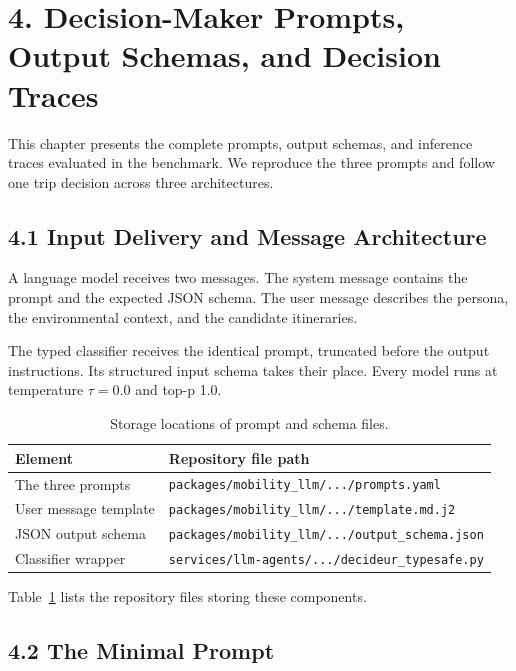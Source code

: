 \section{4. Decision-Maker Prompts, Output Schemas, and Decision Traces}

This chapter presents the complete prompts, output schemas, and inference traces evaluated in the benchmark. We reproduce the three prompts and follow one trip decision across three architectures.

\subsection{4.1 Input Delivery and Message Architecture}

A language model receives two messages. The system message contains the prompt and the expected JSON schema. The user message describes the persona, the environmental context, and the candidate itineraries.

The typed classifier receives the identical prompt, truncated before the output instructions. Its structured input schema takes their place. Every model runs at temperature $\tau = 0.0$ and top-p 1.0.

\begin{table}[h]
\centering
\caption{Storage locations of prompt and schema files.}
\label{tab-prompts-files}
\small
\begin{tabularx}{\columnwidth}{lX}
\toprule
\textbf{Element} & \textbf{Repository file path} \\
\midrule
The three prompts & \texttt{packages/mobility_llm/.../prompts.yaml} \\
User message template & \texttt{packages/mobility_llm/.../template.md.j2} \\
JSON output schema & \texttt{packages/mobility_llm/.../output_schema.json} \\
Classifier wrapper & \texttt{services/llm-agents/.../decideur_typesafe.py} \\
\bottomrule
\end{tabularx}
\end{table}

Table~\ref{tab-prompts-files} lists the repository files storing these components.





\subsection{4.2 The Minimal Prompt}

